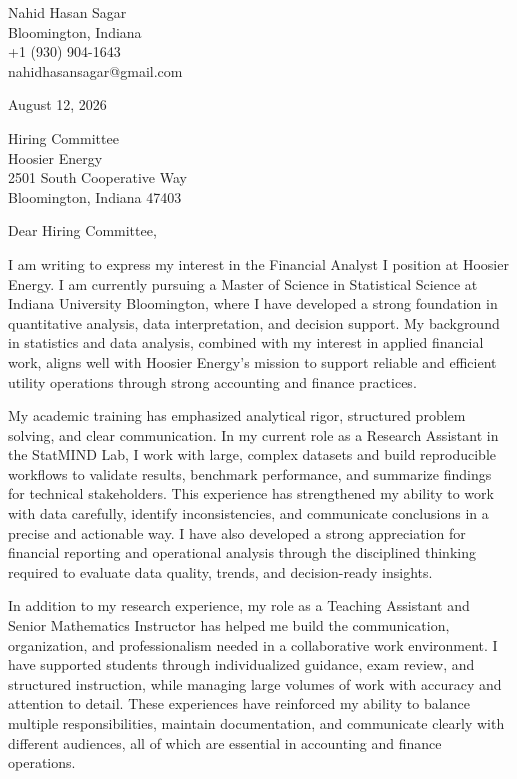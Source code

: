 \documentclass[10pt,letterpaper]{article}
\begin{document}
\begin{flushleft}
Nahid Hasan Sagar\\
Bloomington, Indiana\\
+1 (930) 904-1643\\
nahidhasansagar@gmail.com
\end{flushleft}

\vspace{1em}

August 12, 2026

Hiring Committee\\
Hoosier Energy\\
2501 South Cooperative Way\\
Bloomington, Indiana 47403

\vspace{1em}

Dear Hiring Committee,

\vspace{0.8em}

I am writing to express my interest in the Financial Analyst I position at Hoosier Energy. I am currently pursuing a Master of Science in Statistical Science at Indiana University Bloomington, where I have developed a strong foundation in quantitative analysis, data interpretation, and decision support. My background in statistics and data analysis, combined with my interest in applied financial work, aligns well with Hoosier Energy's mission to support reliable and efficient utility operations through strong accounting and finance practices.

My academic training has emphasized analytical rigor, structured problem solving, and clear communication. In my current role as a Research Assistant in the StatMIND Lab, I work with large, complex datasets and build reproducible workflows to validate results, benchmark performance, and summarize findings for technical stakeholders. This experience has strengthened my ability to work with data carefully, identify inconsistencies, and communicate conclusions in a precise and actionable way. I have also developed a strong appreciation for financial reporting and operational analysis through the disciplined thinking required to evaluate data quality, trends, and decision-ready insights.

In addition to my research experience, my role as a Teaching Assistant and Senior Mathematics Instructor has helped me build the communication, organization, and professionalism needed in a collaborative work environment. I have supported students through individualized guidance, exam review, and structured instruction, while managing large volumes of work with accuracy and attention to detail. These experiences have reinforced my ability to balance multiple responsibilities, maintain documentation, and communicate clearly with different audiences, all of which are essential in accounting and finance operations.
\end{document}
